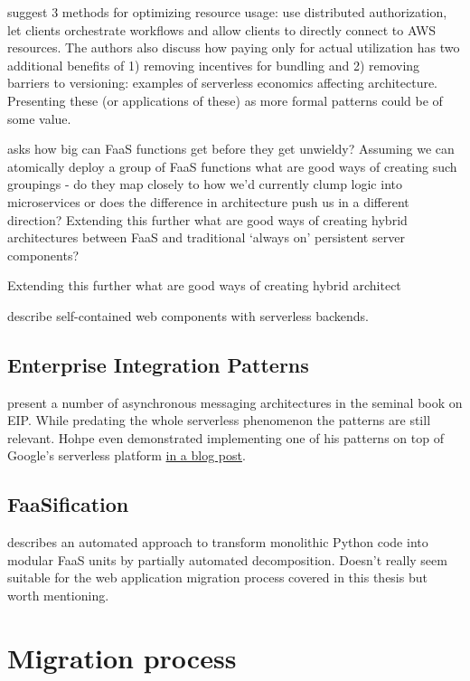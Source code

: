 \documentclass[utf8,english]{gradu3}
\begin{document}
\textcite{adzic2017serverless} suggest 3 methods for optimizing resource usage: use distributed authorization, let clients orchestrate workflows and allow clients to directly connect to AWS resources. The authors also discuss how paying only for actual utilization has two additional benefits of 1) removing incentives for bundling and 2) removing barriers to versioning: examples of serverless economics affecting architecture. Presenting these (or applications of these) as more formal patterns could be of some value.

\textcite{robert2016serverlessarchitectures} asks how big can FaaS functions get before they get unwieldy? Assuming we can atomically deploy a group of FaaS functions what are good ways of creating such groupings - do they map closely to how we’d currently clump logic into microservices or does the difference in architecture push us in a different direction? Extending this further what are good ways of creating hybrid architectures between FaaS and traditional ‘always on’ persistent server components?

Extending this further what are good ways of creating hybrid architect

\textcite{ast17webcomponent} describe self-contained web components with serverless backends.

\section{Enterprise Integration Patterns}

\textcite{hohpe2004enterprise} present a number of asynchronous messaging architectures in the seminal book on EIP. While predating the whole serverless phenomenon the patterns are still relevant. Hohpe even demonstrated implementing one of his patterns on top of Google's serverless platform \href{http://www.enterpriseintegrationpatterns.com/ramblings/google_cloud_functions.html}{in a blog post}.

\section{FaaSification}

\textcite{spillner17transformpython} describes an automated approach to transform monolithic Python code into modular FaaS units by partially automated decomposition. Doesn't really seem suitable for the web application migration process covered in this thesis but worth mentioning.

\chapter{Migration process}
\end{document}
